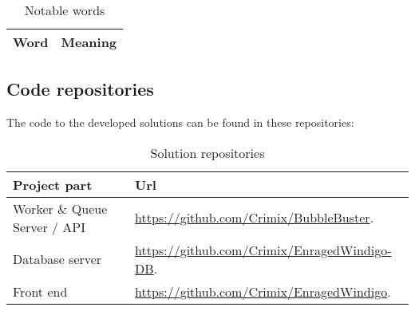 \begin{table}[H]
\centering

\begin{tabular}{|l|p{6cm}|}
\hline
\textbf{Word} & \textbf{Meaning} \\ \hline

\end{tabular}
\caption{Notable words}
\end{table}

\subsection{Code repositories}
The code to the developed solutions can be found in these repositories:

\begin{table}[H]
\centering
\begin{tabular}{|l|p{6cm}|}
\hline
\textbf{Project part} & \textbf{Url} \\ \hline
Worker \& Queue Server / \acs{API}  & \url{https://github.com/Crimix/BubbleBuster}.\\\hline 
Database server & \url{https://github.com/Crimix/EnragedWindigo-DB}. \\\hline 
Front end & \url{https://github.com/Crimix/EnragedWindigo}. \\\hline
\end{tabular}
\caption{Solution repositories}
\end{table}
